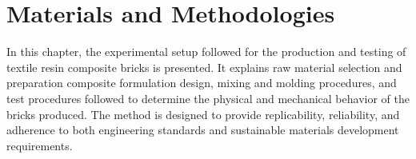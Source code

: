 \chapter{Materials and Methodologies }
In this chapter, the experimental setup followed for the production and testing of textile resin composite bricks is presented. It explains raw material selection and preparation composite formulation design, mixing and molding procedures, and test procedures followed to determine the physical and mechanical behavior of the bricks produced. The method is designed to provide replicability, reliability, and adherence to both engineering standards and sustainable materials development requirements. 

